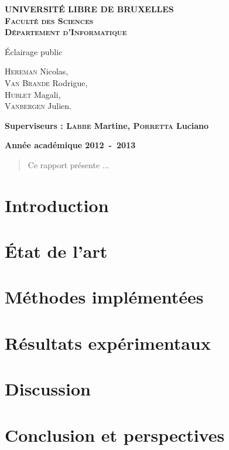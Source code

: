 \documentclass[a4paper,10pt]{report}
\begin{document}
\begin{titlepage}
\begin{center}
\textbf{\textsc{UNIVERSIT\'E LIBRE DE BRUXELLES}}\\
\textbf{\textsc{Faculté des Sciences}}\\
\textbf{\textsc{Département d'Informatique}}
\vfill{}\vfill{}
\begin{center}{\Huge \'Eclairage public}\end{center}{\Huge \par}
\begin{center}{\large \textsc{Hereman} Nicolas,\\\textsc{Van Brande} Rodrigue,\\\textsc{Hublet} Magali,\\\textsc{Vanbergen} Julien.}\end{center}{\Huge \par}
\vfill{}\vfill{}
\begin{flushleft}{\large \textbf{Superviseurs : \textsc{Labbe} Martine, \textsc{Porretta} Luciano}}\hfill{}\end{flushleft}{\large\par}
\vfill{}\vfill{}\enlargethispage{3cm}
\textbf{Année académique 2012~-~2013}
\end{center}
\end{titlepage}

\begin{abstract}
Ce rapport présente ...
\end{abstract}


\tableofcontents

\chapter{Introduction}


\chapter{État de l'art}


\chapter{Méthodes implémentées}


\chapter{Résultats expérimentaux}


\chapter{Discussion}


\chapter{Conclusion et perspectives}





\end{document}
